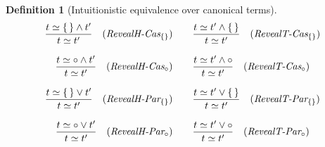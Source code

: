 \documentclass[12pt]{article}
\newtheorem{Definition}{Definition}[section]
\begin{document}
\begin{Definition}[Intuitionistic equivalence over canonical terms]
  \begin{displaymath}
    \begin{array}{c}
      \begin{array}{ll}
        \begin{array}{rl}
          \dfrac{ t \simeq \{\,\} \wedge t' }{
            t \simeq t'
          }  &  (\text{\it RevealH-Cas}_{\{\}})
        \end{array}
        & \begin{array}{rl}
            \dfrac{ t \simeq t' \wedge \{\,\} }{
              t \simeq t'
            }  &  (\text{\it RevealT-Cas}_{\{\}})
          \end{array}
      \end{array}  \\
      \\

      \begin{array}{ll}
        \begin{array}{rl}
          \dfrac{ t \simeq \circ \wedge t' }{
            t \simeq t'
          }  &  (\text{\it RevealH-Cas}_\circ)
        \end{array}
        & \begin{array}{rl}
            \dfrac{ t \simeq t' \wedge \circ }{
              t \simeq t'
            }  &  (\text{\it RevealT-Cas}_\circ)
          \end{array}
      \end{array}  \\
      \\
            
      \begin{array}{ll}
        \begin{array}{rl}
          \dfrac{ t \simeq \{\,\} \vee t' }{
            t \simeq t'
          }  &  (\text{\it RevealH-Par}_{\{\}})
        \end{array}
        & \begin{array}{rl}
            \dfrac{ t \simeq t' \vee \{\,\} }{
              t \simeq t'
            }  &  (\text{\it RevealT-Par}_{\{\}})
          \end{array}
      \end{array}  \\
      \\

      \begin{array}{ll}
        \begin{array}{rl}
          \dfrac{ t \simeq \circ \vee t' }{
            t \simeq t'
          }  &  (\text{\it RevealH-Par}_\circ)
        \end{array}
        & \begin{array}{rl}
            \dfrac{ t \simeq t' \vee \circ }{
              t \simeq t'
            }  &  (\text{\it RevealT-Par}_\circ)
          \end{array}
      \end{array}  \\
      \\
      

\end{array}
\end{displaymath}
\end{Definition}
\end{document}

